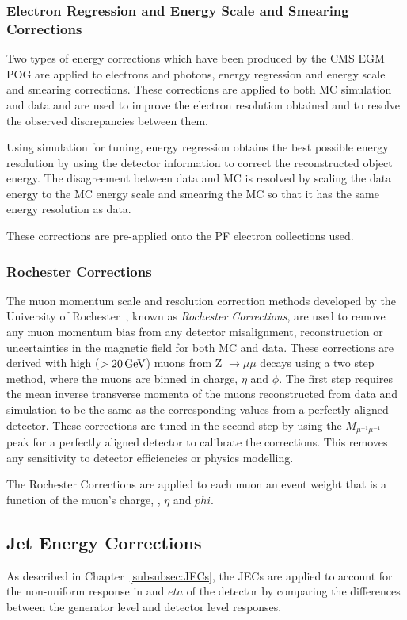 \subsubsection{Electron Regression and Energy Scale and Smearing Corrections}
Two types of energy corrections which have been produced by the CMS EGM POG are applied to electrons and photons, energy regression and energy scale and smearing corrections.
These corrections are applied to both MC simulation and data and are used to improve the electron resolution obtained and to resolve the observed discrepancies between them.

Using simulation for tuning, energy regression obtains the best possible energy resolution by using the detector information to correct the reconstructed object energy.
The disagreement between data and MC is resolved by scaling the data energy to the MC energy scale and smearing the MC so that it has the same energy resolution as data. 

These corrections are pre-applied onto the PF electron collections used.

\subsubsection{Rochester Corrections}
The muon momentum scale and resolution correction methods developed by the University of Rochester~\cite{rochester}, known as \emph{Rochester Corrections}, are used to remove any muon momentum bias from any detector misalignment, reconstruction or uncertainties in the magnetic field for both MC and data.
These corrections are derived with high \pt ($> 20\,\text{Ge\hspace{-.08em}V}$) muons from Z $ \rightarrow \mu\mu$ decays using a two step method, where the muons are binned in charge, $\eta$ and $\phi$.
The first step requires the mean inverse transverse momenta of the muons reconstructed from data and simulation to be the same as the corresponding values from a perfectly aligned detector.
These corrections are tuned in the second step by using the $M_{\mu^{+1}\mu^{-1}}$ peak for a perfectly aligned detector to calibrate the corrections.
This removes any sensitivity to detector efficiencies or physics modelling.

The Rochester Corrections are applied to each muon an event weight that is a function of the muon's charge, \pt, $\eta$ and $phi$.

\subsection{Jet Energy Corrections}\label{subsec:jesjer}
As described in Chapter~\ref{subsubsec:JECs}, the JECs are applied to account for the non-uniform response in \pT and $eta$ of the detector by comparing the differences between the generator level and detector level responses.

